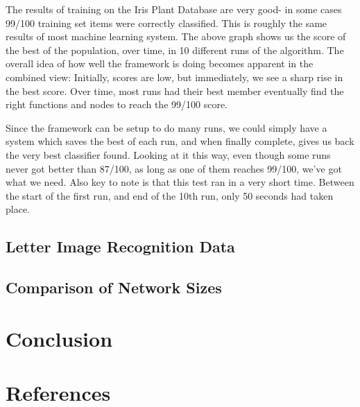 \documentclass[a4paper,11pt]{report}
\begin{document}
The results of training on the Iris Plant Database are very good- in some cases 99/100 training set items were 
correctly classified. This is roughly the same results of most machine learning system. The above graph 
shows us the score of the best of the population, over time, in 10 different runs of the algorithm. The overall 
idea of how well the framework is doing becomes apparent in the combined view: Initially, scores are low, but 
immediately, we see a sharp rise in the best score. Over time, most runs had their best member eventually find 
the right functions and nodes to reach the 99/100 score. 

Since the framework can be setup to do many runs, we could simply have a system which saves the best of each run, 
and when finally complete, gives us back the very best classifier found. Looking at it this way, even though some 
runs never got better than 87/100, as long as one of them reaches 99/100, we've got what we need. Also key to note 
is that this test ran in a very short time. Between the start of the first run, and end of the 10th run, only 50 
seconds had taken place. 

\section{Letter Image Recognition Data}


\section{Comparison of Network Sizes}


\chapter{Conclusion}





\chapter{References}

\end{document}
